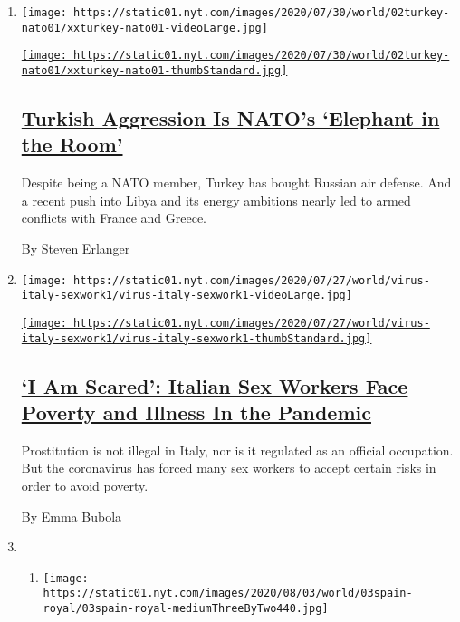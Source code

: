 \begin{enumerate}
\def\labelenumi{\arabic{enumi}.}
\item
  \texttt{[image: https://static01.nyt.com/images/2020/07/30/world/02turkey-nato01/xxturkey-nato01-videoLarge.jpg]}

  \href{/2020/08/03/world/europe/turkey-nato.html}{\texttt{[image: https://static01.nyt.com/images/2020/07/30/world/02turkey-nato01/xxturkey-nato01-thumbStandard.jpg]}}

  \hypertarget{turkish-aggression-is-natos-elephant-in-the-room}{%
  \subsection{\texorpdfstring{\href{/2020/08/03/world/europe/turkey-nato.html}{Turkish
  Aggression Is NATO's `Elephant in the
  Room'}}{Turkish Aggression Is NATO's `Elephant in the Room'}}\label{turkish-aggression-is-natos-elephant-in-the-room}}

  Despite being a NATO member, Turkey has bought Russian air defense.
  And a recent push into Libya and its energy ambitions nearly led to
  armed conflicts with France and Greece.

  By Steven Erlanger
\item
  \texttt{[image: https://static01.nyt.com/images/2020/07/27/world/virus-italy-sexwork1/virus-italy-sexwork1-videoLarge.jpg]}

  \href{/2020/08/03/world/europe/italy-coronavirus-prostitution-sex-work.html}{\texttt{[image: https://static01.nyt.com/images/2020/07/27/world/virus-italy-sexwork1/virus-italy-sexwork1-thumbStandard.jpg]}}

  \hypertarget{i-am-scared-italian-sex-workers-face-poverty-and-illness-in-the-pandemic}{%
  \subsection{\texorpdfstring{\href{/2020/08/03/world/europe/italy-coronavirus-prostitution-sex-work.html}{`I
  Am Scared': Italian Sex Workers Face Poverty and Illness In the
  Pandemic}}{`I Am Scared': Italian Sex Workers Face Poverty and Illness In the Pandemic}}\label{i-am-scared-italian-sex-workers-face-poverty-and-illness-in-the-pandemic}}

  Prostitution is not illegal in Italy, nor is it regulated as an
  official occupation. But the coronavirus has forced many sex workers
  to accept certain risks in order to avoid poverty.

  By Emma Bubola
\item
  \begin{enumerate}
  \def\labelenumii{\arabic{enumii}.}
  \item
    \texttt{[image: https://static01.nyt.com/images/2020/08/03/world/03spain-royal/03spain-royal-mediumThreeByTwo440.jpg]}


\end{enumerate}
\end{enumerate}
